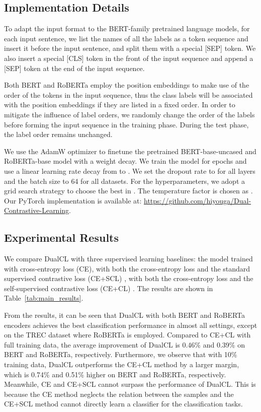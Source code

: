 \subsection{Implementation Details}

To adapt the input format to the BERT-family pretrained language models, for each input sentence, we list the names of all the labels as a token sequence and insert it before the input sentence, and split them with a special [SEP] token. We also insert a special [CLS] token in the front of the input sequence and append a [SEP] token at the end of the input sequence.

Both BERT and RoBERTa employ the position embeddings to make use of the order of the tokens in the input sequence, thus the class labels will be associated with the position embeddings if they are listed in a fixed order. In order to mitigate the influence of label orders, we randomly change the order of the labels before forming the input sequence in the training phase. During the test phase, the label order remains unchanged.

We use the AdamW \cite{loshchilov2018decoupled} optimizer to finetune the pretrained BERT-base-uncased and RoBERTa-base model \cite{wolf2019huggingface} with a  weight decay. We train the model for  epochs and use a linear learning rate decay from  to . We set the dropout rate to  for all layers and the batch size to 64 for all datasets. For the hyperparameters, we adopt a grid search strategy to choose the best  in . The temperature factor  is chosen as . Our PyTorch implementation is available at: \url{https://github.com/hiyouga/Dual-Contrastive-Learning}.

\subsection{Experimental Results}

We compare DualCL with three supervised learning baselines: the model trained with cross-entropy loss (CE), with both the cross-entropy loss and the standard supervised contrastive loss (CE+SCL) \cite{gunel2021supervised_contrastive_language}, with both the cross-entropy loss and the self-supervised contrastive loss (CE+CL) \cite{gao2021simcse}. The results are shown in Table~\ref{tab:main_results}. 

From the results, it can be seen that DualCL with both BERT and RoBERTa encoders achieves the best classification performance in almost all settings, except on the TREC dataset where RoBERTa is employed. Compared to CE+CL with full training data, the average improvement of DualCL is 0.46\% and 0.39\% on BERT and RoBERTa, respectively. Furthermore, we observe that with 10\% training data, DualCL outperforms the CE+CL method by a larger margin, which is 0.74\% and 0.51\% higher on BERT and RoBERTa, respectively. Meanwhile, CE and CE+SCL cannot surpass the performance of DualCL. This is because the CE method neglects the relation between the samples and the CE+SCL method cannot directly learn a classifier for the classification tasks.

